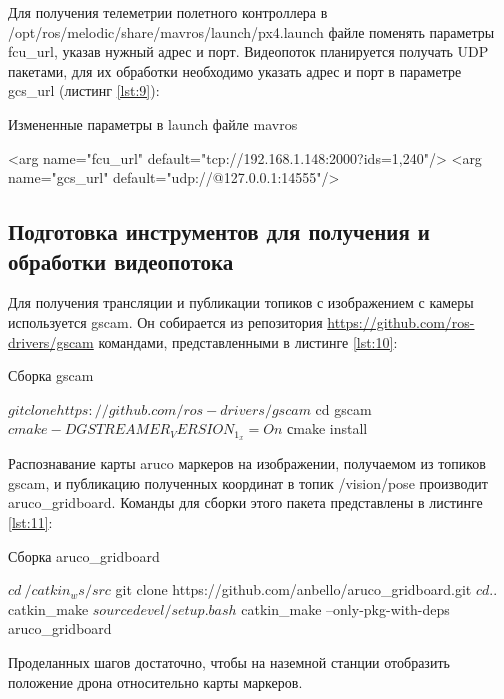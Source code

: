 Для получения телеметрии полетного контроллера в /opt/ros/melodic/sha\-re/mavros/launch/px4.launch файле поменять параметры fcu\_url, указав нужный адрес и порт. Видеопоток планируется получать UDP пакетами, для их обработки необходимо указать адрес и порт в параметре gcs\_url (листинг \ref{lst:9}):
\begin{Program}[H]
	\caption{Измененные параметры в launch файле mavros} \label{lst:9}
	\begin{MyCode}
		<arg name="fcu_url" default="tcp://192.168.1.148:2000?ids=1,240"/>   
		<arg name="gcs_url" default="udp://@127.0.0.1:14555"/>
	\end{MyCode}
\end{Program}

\subsection{Подготовка инструментов для получения и обработки видеопотока}
Для получения трансляции и публикации топиков с изображением с камеры используется gscam. Он собирается из репозитория \url{https://github.com/ros-drivers/gscam} командами, представленными в листинге \ref{lst:10}:
\begin{Program}[H]
	\caption{Сборка gscam} \label{lst:10}
	\begin{MyCode}
		$ git clone https://github.com/ros-drivers/gscam
		$ cd gscam
		$ cmake -DGSTREAMER_VERSION_1_x=On
		$ сmake install
	\end{MyCode}
\end{Program}

Распознавание карты aruco маркеров на изображении, получаемом из топиков gscam, и публикацию полученных координат в топик /vision/pose производит aruco\_gridboard. Команды для сборки этого пакета представлены в листинге \ref{lst:11}:
\begin{Program}[H]
	\caption{Сборка aruco\_gridboard} \label{lst:11}
	\begin{MyCode}
		$ cd ~/catkin_ws/src
		$ git clone https://github.com/anbello/aruco_gridboard.git
		$ cd ..
		$ catkin_make
		$ source devel/setup.bash
		$ catkin_make --only-pkg-with-deps aruco_gridboard
	\end{MyCode}
\end{Program}

Проделанных шагов достаточно, чтобы на наземной станции отобразить положение дрона относительно карты маркеров.